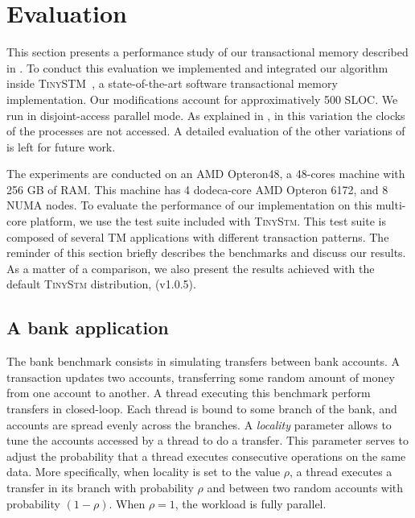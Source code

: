 \section{Evaluation}

This section presents a performance study of our \SPSER transactional memory described in .
To conduct this evaluation we implemented and integrated our algorithm inside \textsc{TinySTM}~\cite{FelberFMR10}, a state-of-the-art software transactional memory implementation.
Our modifications account for approximatively 500 SLOC.
We run  in disjoint-access parallel mode.
As explained in , in this variation the clocks of the processes are not accessed.
A detailed evaluation of the other variations of  is left for future work.

The experiments are conducted on an AMD Opteron48, a 48-cores machine with 256 GB of RAM. 
This machine has 4 dodeca-core AMD Opteron 6172, and 8 NUMA nodes.
To evaluate the performance of our implementation on this multi-core platform, we use the test suite included with \textsc{TinyStm}.
This test suite is composed of several TM applications with different transaction patterns.
The reminder of this section briefly describes the benchmarks and discuss our results.
As a matter of a comparison, we also present the results achieved with the default \textsc{TinyStm} distribution, (v1.0.5).
 
\subsection{A bank application}

The bank benchmark consists in simulating transfers between bank accounts.
A transaction updates two accounts, transferring some random amount of money from one account to another.
A thread executing this benchmark perform transfers in closed-loop.
Each thread is bound to some branch of the bank, and accounts are spread evenly across the branches.
A \emph{locality} parameter allows to tune the accounts accessed by a thread to do a transfer.
This parameter serves to adjust the probability that a thread executes consecutive operations on the same data.
More specifically, when locality is set to the value $\rho$, a thread executes a transfer in its branch with probability $\rho$ and between two random accounts with probability $(1-\rho)$.
When $\rho=1$, the workload is fully parallel.

